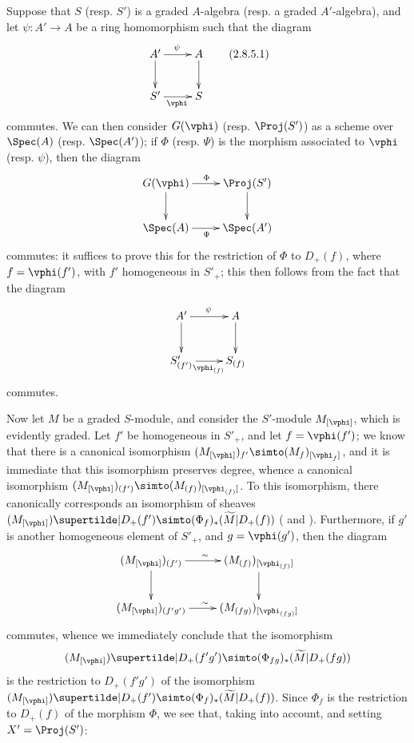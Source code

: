 \begin{env}[2.8.5]
\label{II.2.8.5}
Suppose that $S$ (resp. $S'$) is a graded $A$-algebra (resp. a graded $A'$-algebra), and let $\psi:A'\to A$ be a ring homomorphism such that the diagram
\[
\label{II.2.8.5.1}
  \xymatrix{
    A' \ar[r]^{\psi} \ar[d]
    & A \ar[d]
  \\S' \ar[r]_{\vphi}
    & S
  }
  \tag{2.8.5.1}
\]
commutes.
We can then consider $G(\vphi)$ (resp. $\Proj(S')$) as a scheme over $\Spec(A)$ (resp. $\Spec(A')$);
if $\Phi$ (resp. $\Psi$) is the morphism associated to $\vphi$ (resp. $\psi$), then the diagram
\[
  \xymatrix{
    G(\vphi) \ar[r]^{\Phi} \ar[d]
    & \Proj(S') \ar[d]
  \\\Spec(A) \ar[r]_{\Psi}
    & \Spec(A')
  }
\]
commutes: it suffices to prove this for the restriction of $\Phi$ to $D_+(f)$, where $f=\vphi(f')$, with $f'$ homogeneous in $S'_+$;
this then follows from the fact that the diagram
\[
  \xymatrix{
    A' \ar[r]^{\psi} \ar[d]
    & A \ar[d]
  \\S'_{(f')} \ar[r]_{\vphi_{(f)}}
    & S_{(f)}
  }
\]
commutes.
\end{env}

\begin{env}[2.8.6]
\label{II.2.8.6}
Now let $M$ be a graded $S$-module, and consider the $S'$-module $M_{[\vphi]}$, which is evidently graded.
Let $f'$ be homogeneous in $S'_+$, and let $f=\vphi(f')$;
we know  that there is a canonical isomorphism $(M_{[\vphi]})_{f'}\simto(M_f)_{[\vphi_f]}$, and it is immediate that this isomorphism preserves degree, whence a canonical isomorphism $(M_{[\vphi]})_{(f')}\simto(M_{(f)})_{[\vphi_{(f)}]}$.
To this isomorphism, there canonically corresponds an isomorphism of sheaves $(M_{[\vphi]})\supertilde|D_+(f')\simto(\Phi_f)_*(\widetilde{M}|D_+(f))$ ( and ).
Furthermore,
if $g'$ is another homogeneous element of $S'_+$, and $g=\vphi(g')$, then the diagram
\[
  \xymatrix{
    (M_{[\vphi]})_{(f')} \ar[r]^{\sim} \ar[d]
    & (M_{(f)})_{[\vphi_{(f)}]} \ar[d]
  \\(M_{[\vphi]})_{(f'g')} \ar[r]^{\sim}
    & (M_{(fg)})_{[\vphi_{(fg)}]}
  }
\]
commutes, whence we immediately conclude that the isomorphism
\[
  (M_{[\vphi]})\supertilde|D_+(f'g') \simto (\Phi_{fg})_*(\widetilde{M}|D_+(fg))
\]
is the restriction to $D_+(f'g')$ of the isomorphism $(M_{[\vphi]})\supertilde|D_+(f')\simto(\Phi_f)_*(\widetilde{M}|D_+(f))$.
Since $\Phi_f$ is the restriction to $D_+(f)$ of the morphism $\Phi$, we see that, taking  into account, and setting $X'=\Proj(S')$:
\end{env}

